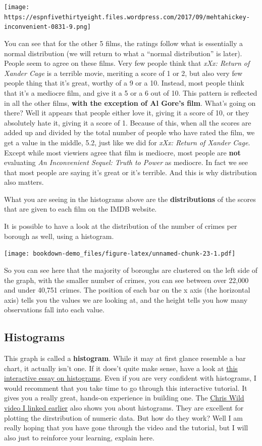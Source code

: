 \documentclass[]{book}
\theoremstyle{definition}
\theoremstyle{definition}
\theoremstyle{definition}
\theoremstyle{remark}
\begin{document}
\texttt{[image: https://espnfivethirtyeight.files.wordpress.com/2017/09/mehtahickey-inconvenient-0831-9.png]}

You can see that for the other 5 films, the ratings follow what is
essentially a normal distribution (we will return to what a ``normal
distribution'' is later). People seem to agree on these films. Very few
people think that \emph{xXx: Return of Xander Cage} is a terrible movie,
meriting a score of 1 or 2, but also very few people thing that it's
great, worthy of a 9 or a 10. Instead, most people think that it's a
mediocre film, and give it a 5 or a 6 out of 10. This pattern is
reflected in all the other films, \textbf{with the exception of Al
Gore's film}. What's going on there? Well it appears that people either
love it, giving it a score of 10, or they absolutely hate it, giving it
a score of 1. Because of this, when all the scores are added up and
divided by the total number of people who have rated the film, we get a
value in the middle, 5.2, just like we did for \emph{xXx: Return of
Xander Cage}. Except while most viewiers agree that film is mediocre,
most people are \textbf{not} evaluating \emph{An Inconvenient Sequel:
Truth to Power} as mediocre. In fact we see that most people are saying
it's great or it's terrible. And this is why distribution also matters.

What you are seeing in the histograms above are the
\textbf{distributions} of the scores that are given to each film on the
IMDB website.

It is possible to have a look at the distribution of the number of
crimes per borough as well, using a histogram.

\texttt{[image: bookdown-demo\_files/figure-latex/unnamed-chunk-23-1.pdf]}

So you can see here that the majority of boroughs are clustered on the
left side of the graph, with the smaller number of crimes, you can see
between over 22,000 and under 40,751 crimes. The position of each bar on
the x axis (the horizontal axis) tells you the values we are looking at,
and the height tells you how many observations fall into each value.

\hypertarget{histograms}{%
\subsection{Histograms}\label{histograms}}

This graph is called a \textbf{histogram}. While it may at first glance
resemble a bar chart, it actually isn't one. If it does't quite make
sense, have a look at \href{http://tinlizzie.org/histograms/}{this
interactive essay on histograms}. Even if you are very confident with
histograms, I would recomment that you take time to go through this
interactive tutorial. It gives you a really great, hands-on experience
in building one. The
\href{https://www.youtube.com/watch?v=U3lk2nQYfAQ\&amp=\&list=PL8CRAVedURQrlxeFfme0TEgaj1_h67JUR\&amp=\&index=4}{Chris
Wild video I linked earlier} also shows you about histograms. They are
excellent for plotting the dirstribution of numeric data. But how do
they work? Well I am really hoping that you have gone through the video
and the tutorial, but I will also just to reinforce your learning,
explain here.
\end{document}

